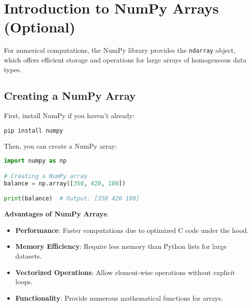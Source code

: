 \section{Introduction to NumPy Arrays (Optional)}\label{sec:numpy_arrays}

For numerical computations, the NumPy library provides the \texttt{ndarray} object, which offers efficient storage and operations for large arrays of homogeneous data types.

\subsection{Creating a NumPy Array}\label{subsec:creating_numpy_array}

First, install NumPy if you haven't already:

\begin{fullwidth}
\begin{lstlisting}[language=bash, caption=Installing NumPy]
pip install numpy
\end{lstlisting}
\end{fullwidth}

Then, you can create a NumPy array:

\begin{fullwidth}
\begin{lstlisting}[language=Python, caption=Creating a NumPy array]
import numpy as np

# Creating a NumPy array
balance = np.array([350, 420, 180])

print(balance)  # Output: [350 420 180]
\end{lstlisting}
\end{fullwidth}

\textbf{Advantages of NumPy Arrays}:

\begin{itemize}
    \item \textbf{Performance}: Faster computations due to optimized C code under the hood.
    \item \textbf{Memory Efficiency}: Require less memory than Python lists for large datasets.
    \item \textbf{Vectorized Operations}: Allow element-wise operations without explicit loops.
    \item \textbf{Functionality}: Provide numerous mathematical functions for arrays.
\end{itemize}

